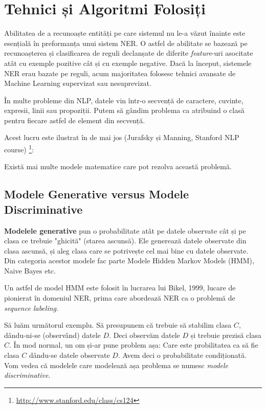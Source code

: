 \chapter{Tehnici și Algoritmi Folosiți}
\label{chapter:algorithms}

Abilitatea de a recunoaște entități pe care sistemul nu le-a văzut înainte este esențială în preformanța unui sistem NER. O astfel de abilitate se bazează pe recunoașterea și clasificarea de reguli declanșate de diferite \textit{feature}-uri asocitate atât cu exemple pozitive cât și cu exemple negative. Dacă la început, sistemele NER erau bazate pe reguli, acum majoritatea folosesc tehnici avansate de Machine Learning supervizat sau nesuprevizat. 

În multe probleme din NLP, datele vin într-o secvență de caractere, cuvinte, expresii, linii sau propoziții. Putem să gândim problema ca atribuind o clasă pentru fiecare astfel de element din secvență.

Acest lucru este ilustrat în  de mai jos (Jurafsky și Manning, Stanford NLP course) \footnote{\url{http://www.stanford.edu/class/cs124}}:


Există mai multe modele matematice care pot rezolva această problemă.

\section{Modele Generative versus Modele Discriminative}
\label{sec:generative-vs-discriminative}

\textbf{Modelele generative} pun o probabilitate atât pe datele observate cât și pe clasa ce trebuie "ghicită" (starea ascunsă). Ele generează datele observate din clasa ascunsă, și aleg clasa care se potrivește cel mai bine cu datele observate. Din categoria acestor modele fac parte Modele Hidden Markov Models (HMM), Naive Bayes etc. 

Un astfel de model HMM este folosit în lucrarea lui Bikel, 1999, lucare de pionierat în domeniul NER, prima care abordează NER ca o problemă de \textit{sequence labeling}.\cite{Bikel99analgorithm}

Să luăm următorul exemplu. Să presupunem că trebuie să stabilim clasa $C$, dându-ni-se (observând) datele $D$. Deci observăm datele $D$ și trebuie prezisă clasa $C$. În mod normal, un om și-ar pune problem așa: Care este probilitatea ca să fie clasa $C$ dându-se datele observate $D$. Avem deci o probabilitate condiționată. Vom vedea că modelele care modelează așa problema se numesc \textit{modele discriminative}.

